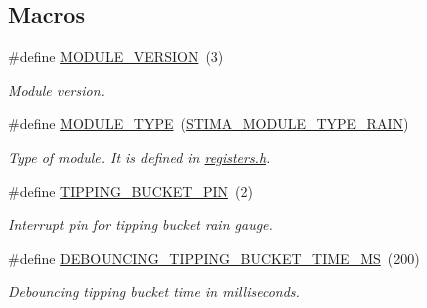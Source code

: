 \subsection*{Macros}
\begin{DoxyCompactItemize}
\item 
\mbox{\label{i2c-rain-config_8h_aa8639a8d4e83d9cc4187d7a751228464}} 
\#define \hyperlink{i2c-rain-config_8h_aa8639a8d4e83d9cc4187d7a751228464}{M\+O\+D\+U\+L\+E\+\_\+\+V\+E\+R\+S\+I\+ON}~(3)
\begin{DoxyCompactList}\small\item\em Module version. \end{DoxyCompactList}\item 
\mbox{\label{i2c-rain-config_8h_a8c815d03b3fd3e18ca06f920a1eb4e8e}} 
\#define \hyperlink{i2c-rain-config_8h_a8c815d03b3fd3e18ca06f920a1eb4e8e}{M\+O\+D\+U\+L\+E\+\_\+\+T\+Y\+PE}~(\hyperlink{stima__module_8h_a4943971f8bec57e337e3f40f085b7fa3}{S\+T\+I\+M\+A\+\_\+\+M\+O\+D\+U\+L\+E\+\_\+\+T\+Y\+P\+E\+\_\+\+R\+A\+IN})
\begin{DoxyCompactList}\small\item\em Type of module. It is defined in \hyperlink{registers_8h}{registers.\+h}. \end{DoxyCompactList}\item 
\mbox{\label{i2c-rain-config_8h_a1023d789b828a59d3d22b2c1dddf5702}} 
\#define \hyperlink{i2c-rain-config_8h_a1023d789b828a59d3d22b2c1dddf5702}{T\+I\+P\+P\+I\+N\+G\+\_\+\+B\+U\+C\+K\+E\+T\+\_\+\+P\+IN}~(2)
\begin{DoxyCompactList}\small\item\em Interrupt pin for tipping bucket rain gauge. \end{DoxyCompactList}\item 
\mbox{\label{i2c-rain-config_8h_a96fb36600c0cea5d22644c26e2d1c7e8}} 
\#define \hyperlink{i2c-rain-config_8h_a96fb36600c0cea5d22644c26e2d1c7e8}{D\+E\+B\+O\+U\+N\+C\+I\+N\+G\+\_\+\+T\+I\+P\+P\+I\+N\+G\+\_\+\+B\+U\+C\+K\+E\+T\+\_\+\+T\+I\+M\+E\+\_\+\+MS}~(200)
\begin{DoxyCompactList}\small\item\em Debouncing tipping bucket time in milliseconds. \end{DoxyCompactList}\item 

\end{DoxyCompactItemize}
